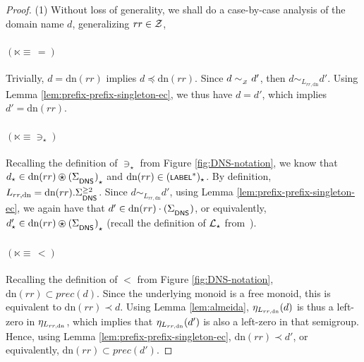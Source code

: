 \begin{proof}
	
	(1) Without loss of generality, we shall do a case-by-case analysis of the domain name $d$, generalizing $rr \in \cal Z$,
	\paragraph{$(\ltimes \equiv\,=)$}
	Trivially, $d = \text{dn}(rr)$ implies $d \preceq \text{dn}(rr)$. Since $d \simZ d'$, then $d \sim_{L_{rr,\text{dn}}} d'$. Using Lemma \ref{lem:prefix-prefix-singleton-ec}, we thus have $d = d'$, which implies $d' = \text{dn}(rr)$.
	\paragraph{$(\ltimes \equiv\ni_\star)$}
	Recalling the definition of $\ni_\star$ from Figure \ref{fig:DNS-notation}, we know that $d_\star \in \text{dn}(rr)\ostar{(\dnsAlph)}_\star$ and $\text{dn}(rr) \in (\scrsf{label}^*)_\star$. By definition, $L_{rr,\text{dn}} = \text{dn}(rr).\dnsAlph^{\geq 2}$. Since $d \sim_{L_{rr,\text{dn}}} d'$, using Lemma \ref{lem:prefix-prefix-singleton-ec}, we again have that $d' \in \text{dn}(rr)\cdot{(\dnsAlph)}$, or equivalently, $d'_\star \in \text{dn}(rr)\ostar{(\dnsAlph)}_\star$ (recall the definition of $\cal L_\star$ from~).
	\paragraph{$(\ltimes \equiv\,<)$}
	Recalling the definition of $<$ from Figure \ref{fig:DNS-notation}, $\text{dn}(rr) \subset prec (d)$. Since the underlying monoid is a free monoid, this is equivalent to $\text{dn}(rr) \prec d$. Using Lemma \ref{lem:almeida}, $\synhom{L_{rr,\text{dn}}}(d)$ is thus a left-zero in $\synhom{L_{rr,\text{dn}}}$, which implies that $\synhom{L_{rr,\text{dn}}}(d')$ is also a left-zero in that semigroup. Hence, using Lemma \ref{lem:prefix-prefix-singleton-ec}, $\text{dn}(rr) \prec d'$, or equivalently, $\text{dn}(rr) \subset prec (d')$.
	

\end{proof}
